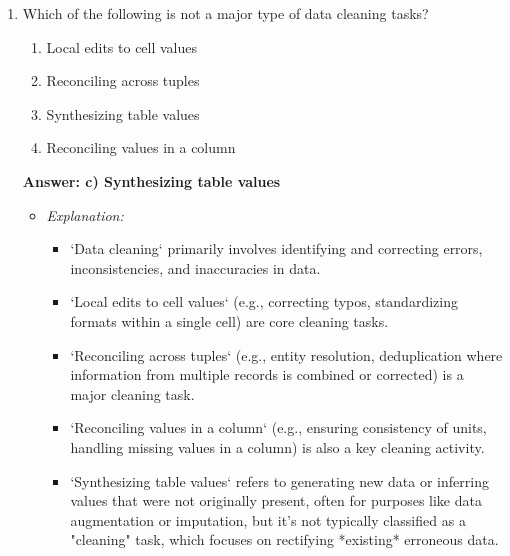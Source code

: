 \documentclass{article}
\begin{document}
\begin{enumerate}[label=\textbf{Question \arabic*.}]
\item Which of the following is not a major type of data cleaning tasks?
    \begin{enumerate}[label=\alph*)]
        \item Local edits to cell values
        \item Reconciling across tuples
        \item Synthesizing table values
        \item Reconciling values in a column
    \end{enumerate}
    \textbf{Answer: c) Synthesizing table values}
    \begin{itemize}
        \item \textit{Explanation:}
        \begin{itemize}
            \item `Data cleaning` primarily involves identifying and correcting errors, inconsistencies, and inaccuracies in data.
            \item `Local edits to cell values` (e.g., correcting typos, standardizing formats within a single cell) are core cleaning tasks.
            \item `Reconciling across tuples` (e.g., entity resolution, deduplication where information from multiple records is combined or corrected) is a major cleaning task.
            \item `Reconciling values in a column` (e.g., ensuring consistency of units, handling missing values in a column) is also a key cleaning activity.
            \item `Synthesizing table values` refers to generating new data or inferring values that were not originally present, often for purposes like data augmentation or imputation, but it's not typically classified as a "cleaning" task, which focuses on rectifying *existing* erroneous data.
        \end{itemize}
    \end{itemize}


\end{enumerate}
\end{document}
